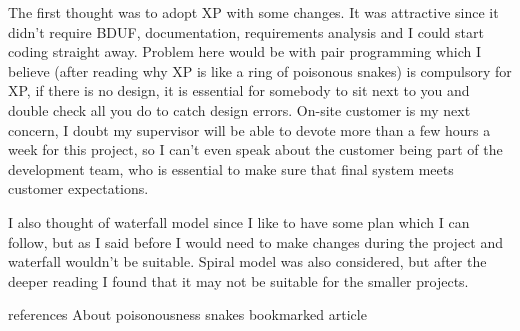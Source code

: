 \documentclass[]{report}
\begin{document}
The first thought was to adopt XP with some changes. It was attractive since it didn't require BDUF, documentation, requirements analysis and I could start coding straight away. Problem here would be with pair programming which I believe (after reading why XP is like a ring of poisonous snakes) is compulsory for XP, if there is no design, it is essential for somebody to sit next to you and double check all you do to catch design errors. On-site customer is my next concern, I doubt my supervisor will be able to devote more than a few hours a week for this project, so I can't even speak about the customer being part of the development team, who is essential to make sure that final system meets customer expectations.

I also thought of waterfall model since I like to have some plan which I can follow, but as I said before I would need to make changes during the project and waterfall wouldn't be suitable. Spiral model was also considered, but after the deeper reading I found that it may not be suitable for the smaller projects.


 
 references
 About poisonousness snakes
 bookmarked article
 
\end{document}
